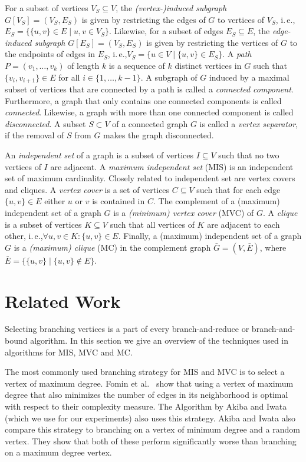 \documentclass[a4paper,UKenglish,cleveref, autoref, thm-restate]{lipics-v2021}
\newcommand{\ie}{i.\,e.,\xspace}
\begin{document}
For a subset of vertices $V_S \subseteq V$, the \emph{(vertex-)induced subgraph}
$G[V_S] = (V_S, E_S)$ is given by restricting the edges of $G$ to vertices of $V_S$, \ie $E_S = \{\{u,v\} \in E \mid u,v \in V_S\}$.
Likewise, for a subset of edges $E_S \subseteq E$, the \emph{edge-induced
  subgraph} $G[E_S] = (V_S, E_S)$ is given by restricting the vertices of $G$ to the endpoints of edges in $E_S$, \ie $V_S = \{u \in V \mid \{u,v\} \in E_S\}$.
A \emph{path} $P=(v_1, \ldots, v_k)$ of length $k$ is a sequence of $k$ distinct vertices in $G$ such that $\{v_i, v_{i+1}\} \in E$ for all $i \in \{1, \ldots, k-1\}$.
A subgraph of $G$ induced by a maximal subset of vertices that are connected by a path is called a \emph{connected component}.
Furthermore, a graph that only contains one connected components is called \emph{connected}.
Likewise, a graph with more than one connected component is called \emph{disconnected}.
A subset $S \subset V$ of a connected graph $G$ is called a \emph{vertex separator}, if the removal of $S$ from $G$ makes the graph disconnected.

An \emph{independent set} of a graph is a subset of vertices $I \subseteq V$ such that no two vertices of $I$ are adjacent. 
A \emph{maximum independent set} (MIS) is an independent set of maximum cardinality.
Closely related to independent set are vertex covers and cliques.
A \emph{vertex cover} is a set of vertices $C \subseteq V$ such that for each edge $\{u,v\} \in E$ either $u$ or $v$ is contained in $C$.
The complement of a (maximum) independent set of a graph $G$ is a \emph{(minimum) vertex cover} (MVC) of $G$.
A \emph{clique} is a subset of vertices $K \subseteq V$ such that all vertices of $K$ are adjacent to each other, \ie $\forall u,v \in K: \{u,v\} \in E$.
Finally, a (maximum) independent set of a graph $G$ is a \emph{(maximum) clique} (MC) in the complement graph $\bar{G} = (V, \bar{E})$, where $\bar{E} = \{\{u,v\} \mid \{u,v\} \not\in E\}$.

\section{Related Work}
Selecting branching vertices is a part of every branch-and-reduce or
branch-and-bound algorithm. In this section we give an overview of the techniques used in
algorithms for MIS, MVC and MC.

The most commonly used branching strategy for MIS and MVC is to select a vertex
of maximum degree. Fomin et al.~\cite{Fomin} show that using a vertex of maximum
degree that also minimizes the number of edges in its neighborhood is optimal
with respect to their complexity measure. The Algorithm by Akiba and Iwata~\cite{AkibaIwata}
(which we use for our experiments) also uses this strategy. Akiba and Iwata also
compare this strategy to branching on a vertex of minimum degree and a random
vertex. They show that both of these perform significantly worse than branching
on a maximum degree vertex.
\end{document}
